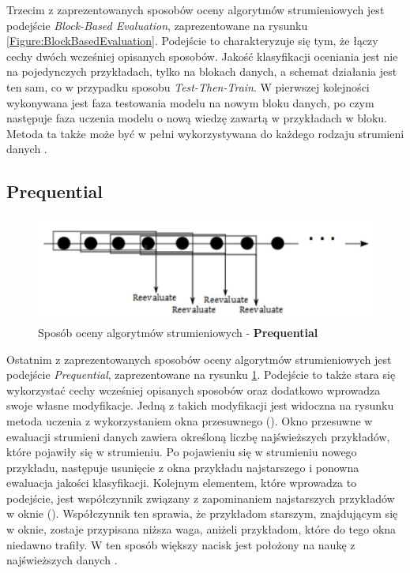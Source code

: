 \noindent Trzecim z zaprezentowanych sposobów oceny algorytmów strumieniowych jest podejście \textit{Block-Based Evaluation}, zaprezentowane na rysunku \ref{Figure:BlockBasedEvaluation}. Podejście to charakteryzuje się tym, że łączy cechy dwóch wcześniej opisanych sposobów. Jakość klasyfikacji oceniania jest nie na pojedynczych przykładach, tylko na blokach danych, a schemat działania jest ten sam, co w przypadku sposobu \textit{Test-Then-Train}. W pierwszej kolejności wykonywana jest faza testowania modelu na nowym bloku danych, po czym następuje faza uczenia modelu o nową wiedzę zawartą w przykładach w bloku. Metoda ta także może być w pełni wykorzystywana do każdego rodzaju strumieni danych \cite{DBrzezinski}.

\subsection{Prequential}

\begin{figure}[h] 
    \centering
    \includegraphics[width=15cm]{figures/prequential.JPG}
    \caption{Sposób oceny algorytmów strumieniowych - \textbf{Prequential} \cite{Prezentacja:Strumienie}}\label{Figure:Prequential}
\end{figure}

\noindent Ostatnim z zaprezentowanych sposobów oceny algorytmów strumieniowych jest podejście \textit{Prequential}, zaprezentowane na rysunku \ref{Figure:Prequential}. Podejście to także stara się wykorzystać cechy wcześniej opisanych sposobów oraz dodatkowo wprowadza swoje własne modyfikacje. Jedną z takich modyfikacji jest widoczna na rysunku metoda uczenia z wykorzystaniem okna przesuwnego (). Okno przesuwne w ewaluacji strumieni danych zawiera określoną liczbę najświeższych przykładów, które pojawiły się w strumieniu. Po pojawieniu się w strumieniu nowego przykładu, następuje usunięcie z okna przykładu najstarszego i ponowna ewaluacja jakości klasyfikacji. Kolejnym elementem, które wprowadza to podejście, jest współczynnik związany z zapominaniem najstarszych przykładów w oknie (). Współczynnik ten sprawia, że przykładom starszym, znajdującym się w oknie, zostaje przypisana niższa waga, aniżeli przykładom, które do tego okna niedawno trafiły. W ten sposób większy nacisk jest położony na naukę z najświeższych danych \cite{Article:Evaluation}.

